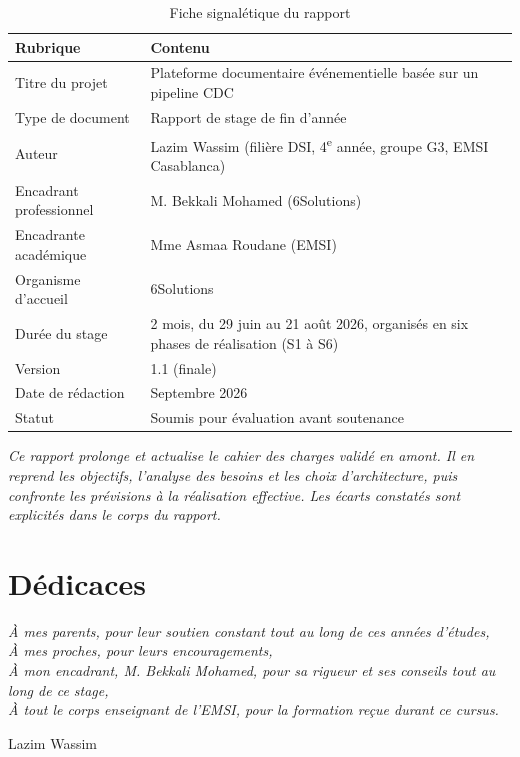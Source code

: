 \documentclass[12pt,a4paper,openany]{report}
\begin{document}
    \begin{table}[H]
    \centering
    \begin{tabularx}{\textwidth}{lX}
    \toprule
    \textbf{Rubrique} & \textbf{Contenu} \\
    \midrule
    Titre du projet   & Plateforme documentaire \'ev\'enementielle bas\'ee sur un pipeline CDC \\
    Type de document  & Rapport de stage de fin d'ann\'ee \\
    Auteur            & Lazim Wassim (fili\`ere DSI, 4\textsuperscript{e} ann\'ee, groupe G3, EMSI Casablanca) \\
    Encadrant professionnel & M. Bekkali Mohamed (6Solutions) \\
    Encadrante acad\'emique & Mme Asmaa Roudane (EMSI) \\
    Organisme d'accueil & 6Solutions \\
    Dur\'ee du stage  & 2 mois, du 29 juin au 21 ao\^ut 2026, organis\'es en six phases de r\'ealisation (S1 \`a S6) \\
    Version           & 1.1 (finale) \\
    Date de r\'edaction & Septembre 2026 \\
    Statut            & Soumis pour \'evaluation avant soutenance \\
    \bottomrule
    \end{tabularx}
    \caption{Fiche signal\'etique du rapport}
    \end{table}

    \noindent\textit{Ce rapport prolonge et actualise le cahier des charges valid\'e en amont. Il en reprend les objectifs, l'analyse des besoins et les choix d'architecture, puis confronte les pr\'evisions \`a la r\'ealisation effective. Les \'ecarts constat\'es sont explicit\'es dans le corps du rapport.}

    \newpage
    \chapter*{D\'edicaces}
    \thispagestyle{empty}
    \vspace*{3cm}
    \begin{flushright}
      \itshape\Large
      \`A mes parents, pour leur soutien constant tout au long de ces ann\'ees d'\'etudes,\\[0.5cm]
      \`A mes proches, pour leurs encouragements,\\[0.5cm]
      \`A mon encadrant, M. Bekkali Mohamed, pour sa rigueur et ses conseils tout au long de ce stage,\\[0.5cm]
      \`A tout le corps enseignant de l'EMSI, pour la formation re\c{c}ue durant ce cursus.
      \vspace{1cm}
      \begin{center}Lazim Wassim\end{center}
    \end{flushright}
\end{document}
